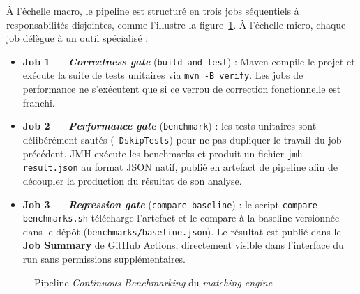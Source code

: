 À l'échelle macro, le pipeline est structuré en trois jobs séquentiels à responsabilités disjointes, comme l'illustre la figure~\ref{fig:pipeline-continuous-benchmarking}. À l'échelle micro, chaque job délègue à un outil spécialisé :

\begin{itemize}
    \item \textbf{Job 1 --- \textit{Correctness gate}} (\texttt{build-and-test}) : Maven compile le projet et exécute la suite de tests unitaires via \texttt{mvn -B verify}. Les jobs de performance ne s'exécutent que si ce verrou de correction fonctionnelle est franchi.
    \item \textbf{Job 2 --- \textit{Performance gate}} (\texttt{benchmark}) : les tests unitaires sont délibérément sautés (\texttt{-DskipTests}) pour ne pas dupliquer le travail du job précédent. JMH exécute les benchmarks et produit un fichier \texttt{jmh-result.json} au format JSON natif, publié en artefact de pipeline afin de découpler la production du résultat de son analyse.
    \item \textbf{Job 3 --- \textit{Regression gate}} (\texttt{compare-baseline}) : le script \texttt{compare-benchmarks.sh} télécharge l'artefact et le compare à la baseline versionnée dans le dépôt (\texttt{benchmarks/baseline.json}). Le résultat est publié dans le \textbf{Job Summary} de GitHub Actions, directement visible dans l'interface du run sans permissions supplémentaires.
\end{itemize}

\begin{figure}[H]
    \centering
    
    \caption{Pipeline \textit{Continuous Benchmarking} du \textit{matching engine}}
    \label{fig:pipeline-continuous-benchmarking}
\end{figure}


